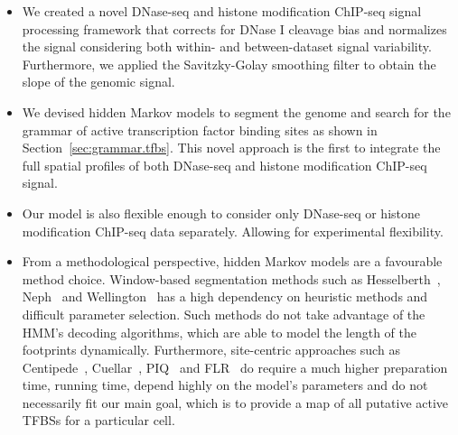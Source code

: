 \begin{itemize}
\item We created a novel DNase-seq and histone modification ChIP-seq signal processing framework that corrects for DNase I cleavage bias and normalizes the signal considering both within- and between-dataset signal variability. Furthermore, we applied the Savitzky-Golay smoothing filter to obtain the slope of the genomic signal.
\item We devised hidden Markov models to segment the genome and search for the grammar of active transcription factor binding sites as shown in Section~\ref{sec:grammar.tfbs}. This novel approach is the first to integrate the full spatial profiles of both DNase-seq and histone modification ChIP-seq signal.
\item Our model is also flexible enough to consider only DNase-seq or histone modification ChIP-seq data separately. Allowing for experimental flexibility.
\item From a methodological perspective, hidden Markov models are a favourable method choice. Window-based segmentation methods such as Hesselberth~\cite{hesselberth2009}, Neph~\cite{neph2012a} and Wellington~\cite{piper2013} has a high dependency on heuristic methods and difficult parameter selection. Such methods do not take advantage of the HMM's decoding algorithms, which are able to model the length of the footprints dynamically. Furthermore, site-centric approaches such as Centipede~\cite{pique2011}, Cuellar~\cite{cuellar2012}, PIQ~\cite{sherwood2014} and FLR~\cite{yardimci2014} do require a much higher preparation time, running time, depend highly on the model's parameters and do not necessarily fit our main goal, which is to provide a map of all putative active TFBSs for a particular cell.
\end{itemize}


